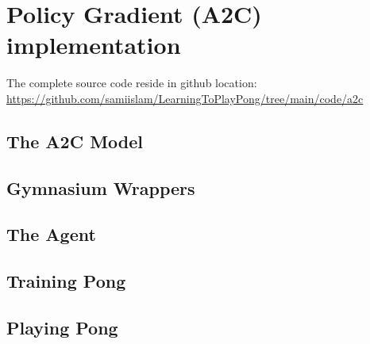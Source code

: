 \chapter {Policy Gradient (A2C) implementation}

The complete source code reside in github location: \url{https://github.com/samiislam/LearningToPlayPong/tree/main/code/a2c}

\section{The A2C Model}


\section{Gymnasium Wrappers}


\section{The Agent}


\section{Training Pong}


\section{Playing Pong}
